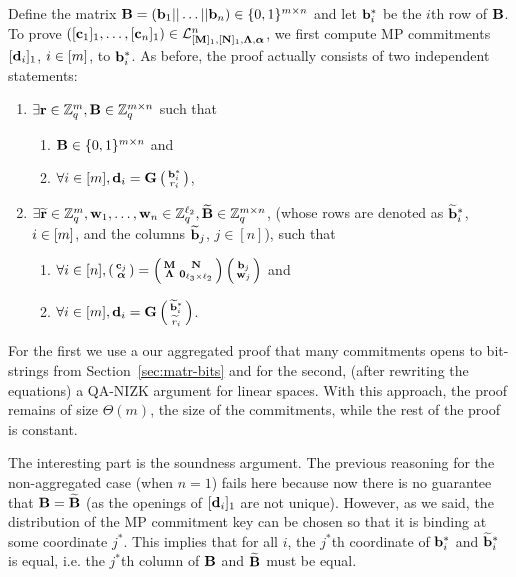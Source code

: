 Define the matrix $\mathbf{{B}}=(\mathbf{b}_1|| \ldots || \mathbf{b}_n) \in \{0,1\}^{{m} \times n}$ and let $\mathbf{b}_i^*$ be the $i$th row of $\mathbf{{B}}$. To prove $([\mathbf{c}_1]_1,\ldots, [\mathbf{c}_n]_1) \in\mathcal{L}_{[\mathbf{{M}}]_1,[\mathbf{{N}}]_1,\mathbf{{\Lambda}},{\boldsymbol \alpha}}^n$, we first compute MP commitments $[\mathbf{d}_i]_1$, $i \in [{m}]$, to $\mathbf{b}_i^*$.  As before, 
the proof actually consists of two independent statements:
\begin{enumerate}
\item $\exists \mathbf{r} \in \mathbb{Z}_q^{m}, \mathbf{{B}} \in \mathbb{Z}_q^{{m} \times n}$ such that  
    \begin{enumerate}
    \item $\mathbf{{B}} \in \{0,1\}^{{m} \times n}$ and
    \item $\forall i \in [m], \mathbf{d}_i=\mathbf{{G}}\left(\begin{smallmatrix}\mathbf{b}_i^*  \\ r_i\end{smallmatrix}\right)$,
    \end{enumerate}
\item $\exists \widetilde{\mathbf{r}}\in\mathbb{Z}_q^{m}, \mathbf{w}_1,\ldots,\mathbf{w}_n \in\mathbb{Z}_q^{\ell_2}, \widetilde{\mathbf{{B}}} \in \mathbb{Z}_q^{{m} \times n}$, (whose rows are denoted as $\widetilde{\mathbf{b}}_i^*$, $i \in [{m}]$, and the columns $\widetilde{\mathbf{b}}_j$, $j \in [n]$), such that  
   \begin{enumerate}
   \item $\forall i\in[n], \left(\begin{smallmatrix}
    \mathbf{c}_j\\
    {\boldsymbol \alpha}
\end{smallmatrix}\right)
=
\left(\begin{smallmatrix}
    \mathbf{{M}}       & \mathbf{{N}}\\
    \mathbf{{\Lambda}} & \mathbf{{0}}_{{\ell_3}\times {\ell_2}}
\end{smallmatrix}\right)
\left(\begin{smallmatrix}
    \mathbf{b}_j\\
    \mathbf{w}_j
\end{smallmatrix}\right)$ and 
    \item $\forall i \in [{m}], \mathbf{d}_i=\mathbf{{G}}   \left(\begin{smallmatrix}\widetilde{\mathbf{b}}^*_i  \\ \widetilde{r}_i\end{smallmatrix}\right)$.
    \end{enumerate}
\end{enumerate}
For the first we use a our aggregated proof that many commitments opens to bit-strings from Section~\ref{sec:matr-bits} and for the second, (after rewriting the equations) a QA-NIZK argument for linear spaces. With this approach, the proof remains of size $\Theta(m)$, the size of the commitments, while the rest of the proof is constant. 

The interesting part is the soundness argument. The previous reasoning for the non-aggregated case (when $n=1$) fails here because now there is no guarantee that 
 $\mathbf{{B}}=\widetilde{\mathbf{{B}}}$ (as the openings of $[\mathbf{d}_i]_1$ are not unique).  However, as we said, the distribution of the MP commitment key can be chosen so that it is binding at some coordinate $j^*$. This implies that for all $i$, the $j^*$th coordinate of $\mathbf{b}_i^*$ and $\widetilde{\mathbf{b}}_i^*$ is equal, i.e. the $j^*$th column of $\mathbf{{B}}$ and $\widetilde{\mathbf{{B}}}$ must be equal.  

